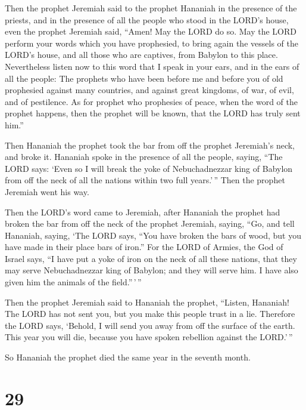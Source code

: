  Then the prophet Jeremiah said to the prophet Hananiah in
the presence of the priests, and in the presence of all the people who
stood in the LORD's house,  even the prophet Jeremiah
said, ``Amen! May the LORD do so. May the LORD perform your words which
you have prophesied, to bring again the vessels of the LORD's house, and
all those who are captives, from Babylon to this place. 
Nevertheless listen now to this word that I speak in your ears, and in
the ears of all the people:  The prophets who have been
before me and before you of old prophesied against many countries, and
against great kingdoms, of war, of evil, and of pestilence.
 As for prophet who prophesies of peace, when the word of
the prophet happens, then the prophet will be known, that the LORD has
truly sent him.''

 Then Hananiah the prophet took the bar from off the
prophet Jeremiah's neck, and broke it.  Hananiah spoke in
the presence of all the people, saying, ``The LORD says: `Even so I will
break the yoke of Nebuchadnezzar king of Babylon from off the neck of
all the nations within two full years.'\,'' Then the prophet Jeremiah
went his way.

 Then the LORD's word came to Jeremiah, after Hananiah
the prophet had broken the bar from off the neck of the prophet
Jeremiah, saying,  ``Go, and tell Hananiah, saying, `The
LORD says, ``You have broken the bars of wood, but you have made in
their place bars of iron.''  For the LORD of Armies, the
God of Israel says, ``I have put a yoke of iron on the neck of all these
nations, that they may serve Nebuchadnezzar king of Babylon; and they
will serve him. I have also given him the animals of the field.''\,'\,''

 Then the prophet Jeremiah said to Hananiah the prophet,
``Listen, Hananiah! The LORD has not sent you, but you make this people
trust in a lie.  Therefore the LORD says, `Behold, I will
send you away from off the surface of the earth. This year you will die,
because you have spoken rebellion against the LORD.'\,''

 So Hananiah the prophet died the same year in the
seventh month.

\hypertarget{section-28}{%
\section{29}\label{section-28}}

